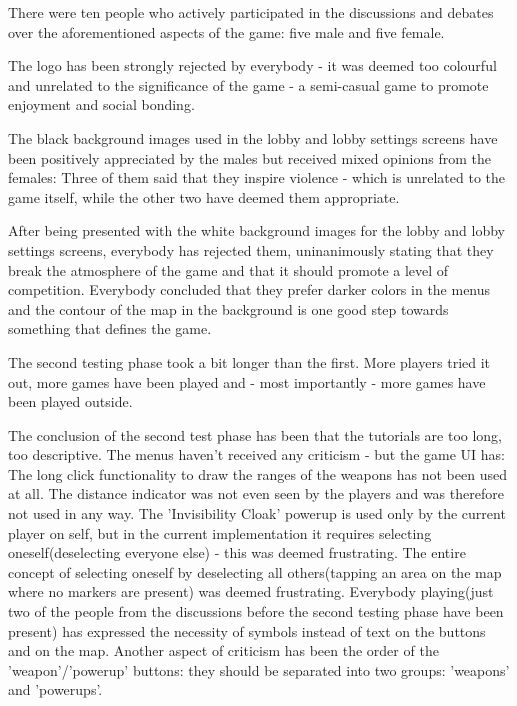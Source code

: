 There were ten people who actively participated in the discussions and debates
over the aforementioned aspects of the game: five male and five female.\newline

The logo has been strongly rejected by everybody - it was deemed too colourful
and unrelated to the significance of the game - a semi-casual game to promote
enjoyment and social bonding.\newline

The black background images used in the lobby and lobby settings screens have
been positively appreciated by the males but received mixed opinions from the
females: Three of them said that they inspire violence - which is unrelated
to the game itself, while the other two have deemed them appropriate.\newline

After being presented with the white background images for the lobby and lobby
settings screens, everybody has rejected them, uninanimously stating that they
break the atmosphere of the game and that it should promote a level of
competition. Everybody concluded that they prefer darker colors in the menus and
the contour of the map in the background is one good step towards something that
defines the game.\newline

The second testing phase took a bit longer than the first. More players tried it
out, more games have been played and - most importantly - more games have been
played outside.\newline

The conclusion of the second test phase has been that the tutorials are too
long, too descriptive. The menus haven't received any criticism - but the game
UI has: The long click functionality to draw the ranges of the weapons has not
been used at all. The distance indicator was not even seen by the players and
was therefore not used in any way. The 'Invisibility Cloak' powerup is used only
by the current player on self, but in the current implementation it requires
selecting oneself(deselecting everyone else) - this was deemed frustrating. The
entire concept of selecting oneself by deselecting all others(tapping an area
on the map where no markers are present) was deemed frustrating. Everybody
playing(just two of the people from the discussions before the second testing
phase have been present) has expressed the necessity of symbols instead of text
on the buttons and on the map. Another aspect of criticism has been the order of
the 'weapon'/'powerup' buttons: they should be separated into two groups:
'weapons' and 'powerups'.\newline
